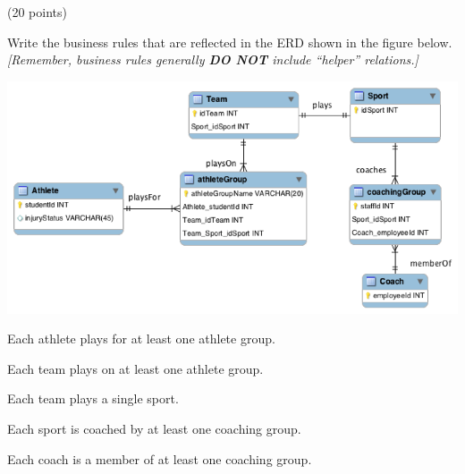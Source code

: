 \begin{problem} (20 points)

  \noindent
  Write the business rules that are reflected in the ERD shown in the figure below.
  \emph{[Remember, business rules generally \textbf{DO NOT} include
  ``helper'' relations.]}

  \includegraphics[scale=0.4]{3.png}
  
\end{problem}
\begin{Answer}
  \begin{enumalph}
    \item Each athlete plays for at least one athlete group.
    \item Each team plays on at least one athlete group.
    \item Each team plays a single sport.
    \item Each sport is coached by at least one coaching group.
    \item Each coach is a member of at least one coaching group.
  \end{enumalph}
\end{Answer}

